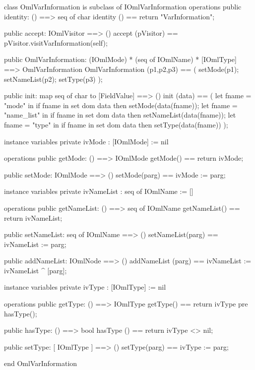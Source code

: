 \begin{vdm_al}
class OmlVarInformation is subclass of IOmlVarInformation
operations
  public identity: () ==> seq of char
  identity () == return "VarInformation";

  public accept: IOmlVisitor ==> ()
  accept (pVisitor) == pVisitor.visitVarInformation(self);

  public OmlVarInformation:
      (IOmlMode) *
      (seq of IOmlName) *
      [IOmlType] ==> OmlVarInformation
  OmlVarInformation (p1,p2,p3) == 
   ( setMode(p1);
     setNameList(p2);
     setType(p3) );

  public init: map seq of char to [FieldValue] ==> ()
  init (data) ==
    ( let fname = "mode" in
        if fname in set dom data
        then setMode(data(fname));
      let fname = "name_list" in
        if fname in set dom data
        then setNameList(data(fname));
      let fname = "type" in
        if fname in set dom data
        then setType(data(fname)) );

instance variables
  private ivMode : [IOmlMode] := nil

operations
  public getMode: () ==> IOmlMode
  getMode() == return ivMode;

  public setMode: IOmlMode ==> ()
  setMode(parg) == ivMode := parg;

instance variables
  private ivNameList : seq of IOmlName := []

operations
  public getNameList: () ==> seq of IOmlName
  getNameList() == return ivNameList;

  public setNameList: seq of IOmlName ==> ()
  setNameList(parg) == ivNameList := parg;

  public addNameList: IOmlNode ==> ()
  addNameList (parg) == ivNameList := ivNameList ^ [parg];

instance variables
  private ivType : [IOmlType] := nil

operations
  public getType: () ==> IOmlType
  getType() == return ivType
    pre hasType();

  public hasType: () ==> bool
  hasType () == return ivType <> nil;

  public setType: [ IOmlType ] ==> ()
  setType(parg) == ivType := parg;

end OmlVarInformation
\end{vdm_al}

